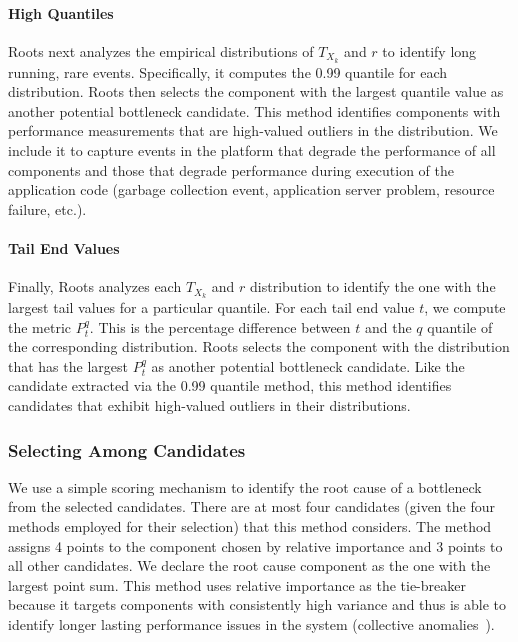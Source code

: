 \paragraph*{High Quantiles}
Roots next analyzes the empirical distributions of $T_{X_k}$ and $r$ to identify 
long running, rare events.  Specifically, it computes the 0.99 quantile
for each distribution.  Roots then selects the component with the largest quantile value as
another potential bottleneck candidate.  This method identifies components with performance
measurements that are high-valued outliers in the distribution. We include it to 
capture events in the platform that degrade the performance of all components and those that
degrade performance during execution of the application code (garbage collection event, application
server problem, resource failure, etc.).

\paragraph*{Tail End Values}
Finally, Roots analyzes each $T_{X_k}$ and $r$ distribution to identify the one 
with the largest tail values for a particular quantile.
For each tail end value $t$, we compute the metric $P^q_t$. 
This is the percentage difference between $t$ and the
$q$ quantile of the corresponding distribution. Roots selects the component with the 
distribution that has the largest $P^q_t$ as another potential bottleneck candidate.
Like the candidate extracted via the 0.99 quantile method, this method identifies
candidates that exhibit high-valued outliers in their distributions.

\subsubsection{Selecting Among Candidates}

We use a simple scoring mechanism to identify the root cause of a bottleneck 
from the selected candidates.  There are at most four candidates (given the four
methods employed for their selection) that this
method considers.  The method assigns 4 points to the component chosen
by relative importance and 3 points to all other candidates. 
We declare the root cause component as the one with the largest
point sum.  This method uses relative importance as the tie-breaker because it
targets components with consistently high variance and thus is able to identify
longer lasting performance issues in the system
(collective anomalies~\cite{Chandola:2009:ADS:1541880.1541882}).


